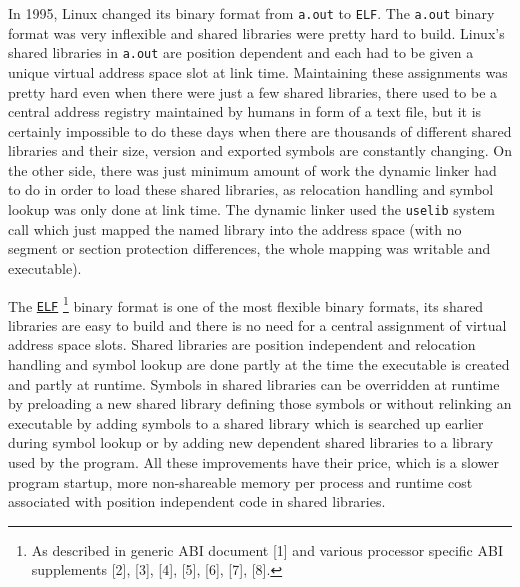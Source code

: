 \documentclass[twoside]{article}
\def\tts#1{\texttt{\small #1}}
\begin{document}
In 1995, Linux changed its binary format from \tts{a.out} to \tts{ELF}.
The \tts{a.out} binary format was very inflexible and shared libraries
were pretty hard to build.  Linux's shared libraries in \tts{a.out} are position
dependent and each had to be given a unique virtual address space slot
at link time.  Maintaining these assignments was pretty hard even when
there were just a few shared libraries, there used to be a central address
registry maintained by humans in form of a text file, but it is certainly
impossible to do these days when there are thousands of different shared libraries
and their size, version and exported symbols are constantly changing.
On the other side, there was just minimum amount of work the dynamic
linker had to do in order to load these shared libraries, as relocation
handling and symbol lookup was only done at link time.  The dynamic linker
used the \tts{uselib} system call which just mapped the named library
into the address space (with no segment or section protection differences,
the whole mapping was writable and executable).

The \href{http://www.caldera.com/developers/devspecs/gabi41.pdf}%
{\tts{ELF}}
\footnote{As described in generic ABI document [1] and various processor
specific ABI supplements [2], [3], [4], [5], [6], [7], [8].}
binary format is one of the most flexible binary formats,
its shared libraries are easy to build and there is no need for a central
assignment of virtual address space slots.  Shared libraries are position
independent and relocation handling and symbol lookup are done partly
at the time the executable is created and partly at runtime.  Symbols in shared
libraries can be overridden at runtime by preloading a new shared
library defining those symbols or without relinking an executable by adding
symbols to a shared library which is searched up earlier during symbol
lookup or by adding new dependent shared libraries to a library used by the
program.  All these improvements have their price, which is a slower
program startup, more non-shareable memory per process and runtime cost
associated with position independent code in shared libraries.
\end{document}
